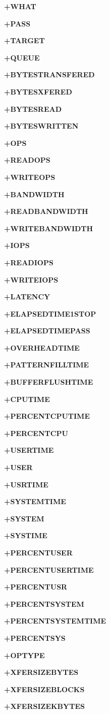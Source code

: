 \textbf{+WHAT}

\textbf{+PASS}

\textbf{+TARGET}

\textbf{+QUEUE}

\textbf{+BYTESTRANSFERED}

\textbf{+BYTESXFERED}

\textbf{+BYTESREAD}

\textbf{+BYTESWRITTEN}

\textbf{+OPS}

\textbf{+READOPS}

\textbf{+WRITEOPS}

\textbf{+BANDWIDTH}

\textbf{+READBANDWIDTH}

\textbf{+WRITEBANDWIDTH}

\textbf{+IOPS}

\textbf{+READIOPS}

\textbf{+WRITEIOPS}

\textbf{+LATENCY}

\textbf{+ELAPSEDTIME1STOP}

\textbf{+ELAPSEDTIMEPASS}

\textbf{+OVERHEADTIME}

\textbf{+PATTERNFILLTIME}

\textbf{+BUFFERFLUSHTIME}

\textbf{+CPUTIME}

\textbf{+PERCENTCPUTIME}

\textbf{+PERCENTCPU}

\textbf{+USERTIME}

\textbf{+USER}

\textbf{+USRTIME}

\textbf{+SYSTEMTIME}

\textbf{+SYSTEM}

\textbf{+SYSTIME}

\textbf{+PERCENTUSER}

\textbf{+PERCENTUSERTIME}

\textbf{+PERCENTUSR}

\textbf{+PERCENTSYSTEM}

\textbf{+PERCENTSYSTEMTIME}

\textbf{+PERCENTSYS}

\textbf{+OPTYPE}

\textbf{+XFERSIZEBYTES}

\textbf{+XFERSIZEBLOCKS}

\textbf{+XFERSIZEKBYTES}

